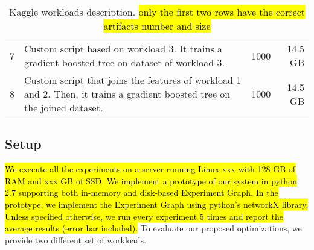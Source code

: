 \begin{table*}[t]
\begin{tabular}{lp{}rr}
7 & \parbox{0.75\textwidth}{\linespread{0.5}\selectfont Custom script based on workload 3. It trains a gradient boosted tree on dataset of workload 3.} & 1000 & 14.5 GB\\[0.3cm]

8 & \parbox{0.75\textwidth}{\linespread{0.5}\selectfont Custom script that joins the features of workload 1 and 2. Then, it trains a gradient boosted tree on the joined dataset.} & 1000 & 14.5 GB\\[0.3cm]

\end{tabular}
\caption{Kaggle workloads description. \hl{only the first two rows have the correct artifacts number and size}}
\label{kaggle-workload}
\end{table*}

\subsection{Setup}
\hl{We execute all the experiments on a server running Linux xxx with 128 GB of RAM and xxx GB of SSD.
We implement a prototype of our system in python 2.7 supporting both in-memory and disk-based Experiment Graph.
In the prototype, we implement the Experiment Graph using python's networkX library.
Unless specified otherwise, we run every experiment 5 times and report the average results (error bar included).}
To evaluate our proposed optimizations, we provide two different set of workloads.

